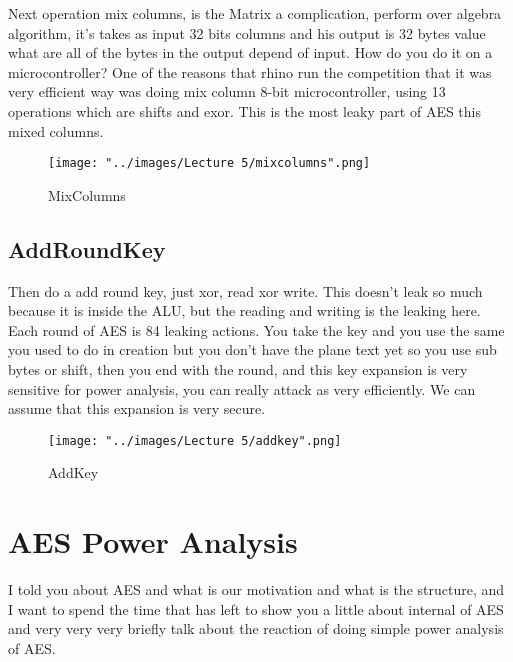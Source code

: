 \documentclass{report}
\begin{document}
Next operation mix columns, is the Matrix a complication, perform over algebra algorithm, it's takes as input 32 bits columns and his output is 32 bytes value what are all of the bytes in the output depend of input. How do you do it on a microcontroller? One of the reasons that rhino run the competition that it was very efficient way was doing mix column 8-bit microcontroller, using 13 operations which are shifts and exor.
This is the most leaky part of AES this mixed columns.

\begin{figure}[htp]
\centering
\texttt{[image: "../images/Lecture 5/mixcolumns".png]}
\caption{MixColumns}
\label{}
\end{figure}

\subsection{AddRoundKey}

Then do a add round key, just xor, read xor write. This doesn't leak so much because it is inside the ALU, but the reading and writing is the leaking here.
Each round of AES is 84 leaking actions. You take the key and you use the same you used to do in creation but you don't have the plane text yet so you use sub bytes or shift, then you end with the round, and this key expansion is very sensitive for power analysis, you can really attack as very efficiently. We can assume that this expansion is very secure.


\begin{figure}[htp]
\centering
\texttt{[image: "../images/Lecture 5/addkey".png]}
\caption{AddKey}
\label{}
\end{figure}

\section{AES Power Analysis}
I told you about AES and what is our motivation and what is the structure, and I want to spend the time that has left to show you a little about internal of AES and very very very briefly talk about the reaction of doing simple power analysis of AES. 
\end{document}
